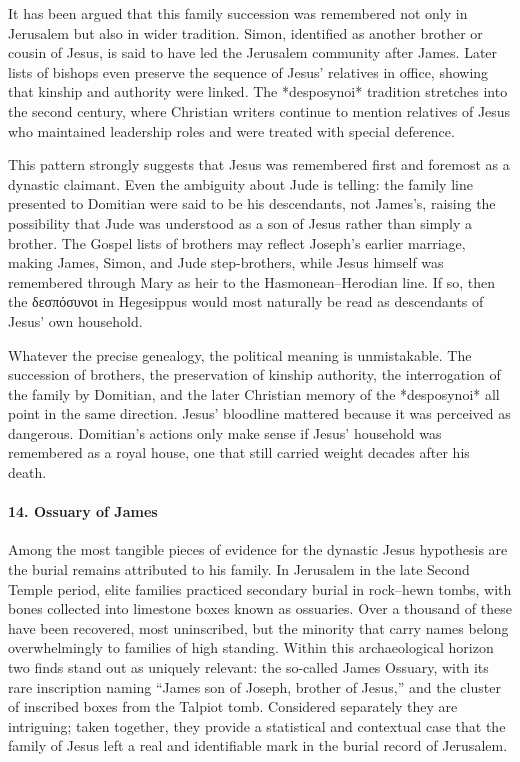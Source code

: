 It has been argued that this family succession was remembered not only in Jerusalem but also in wider tradition.
Simon, identified as another brother or cousin of Jesus, is said to have led the Jerusalem community after James.
Later lists of bishops even preserve the sequence of Jesus’ relatives in office, showing that kinship and authority were linked.
The *desposynoi* tradition stretches into the second century, where Christian writers continue to mention relatives of Jesus who maintained leadership roles and were treated with special deference.

This pattern strongly suggests that Jesus was remembered first and foremost as a dynastic claimant.
Even the ambiguity about Jude is telling: the family line presented to Domitian were said to be his descendants, not James’s, raising the possibility that Jude was understood as a son of Jesus rather than simply a brother.
The Gospel lists of brothers may reflect Joseph’s earlier marriage, making James, Simon, and Jude step-brothers, while Jesus himself was remembered through Mary as heir to the Hasmonean–Herodian line.
If so, then the δεσπόσυνοι in Hegesippus would most naturally be read as descendants of Jesus’ own household.

Whatever the precise genealogy, the political meaning is unmistakable.
The succession of brothers, the preservation of kinship authority, the interrogation of the family by Domitian, and the later Christian memory of the *desposynoi* all point in the same direction.
Jesus’ bloodline mattered because it was perceived as dangerous.
Domitian’s actions only make sense if Jesus’ household was remembered as a royal house, one that still carried weight decades after his death.

\paragraph{14.
Ossuary of James}\label{par:ossuary-of-james}

Among the most tangible pieces of evidence for the dynastic Jesus hypothesis are the burial remains attributed to his family.
In Jerusalem in the late Second Temple period, elite families practiced secondary burial in rock–hewn tombs, with bones collected into limestone boxes known as ossuaries.
Over a thousand of these have been recovered, most uninscribed, but the minority that carry names belong overwhelmingly to families of high standing.
Within this archaeological horizon two finds stand out as uniquely relevant: the so-called James Ossuary, with its rare inscription naming “James son of Joseph, brother of Jesus,” and the cluster of inscribed boxes from the Talpiot tomb.
Considered separately they are intriguing; taken together, they provide a statistical and contextual case that the family of Jesus left a real and identifiable mark in the burial record of Jerusalem.

